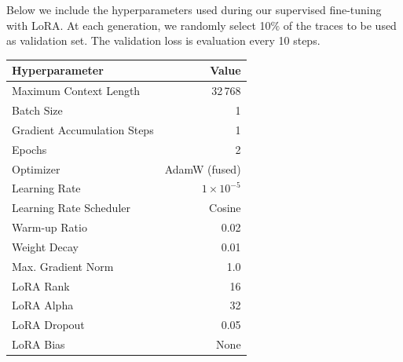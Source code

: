 Below we include the hyperparameters used during our supervised fine-tuning with
LoRA. At each generation, we randomly select 10$\%$ of the traces to be used as
validation set. The validation loss is evaluation every 10 steps.

\begin{center}
\begin{tabular}{lr}
\toprule
\textbf{Hyperparameter}      & \textbf{Value}     \\ \midrule
 Maximum Context Length      & 32\,768            \\
 Batch Size                  & 1                  \\
 Gradient Accumulation Steps & 1                  \\
 Epochs                      & 2                  \\
 Optimizer                   & AdamW (fused)      \\
 Learning Rate               & $1 \times 10^{-5}$ \\
 Learning Rate Scheduler     & Cosine             \\
 Warm-up Ratio                & 0.02               \\
 Weight Decay                & 0.01               \\
 Max. Gradient Norm          & 1.0                \\
 LoRA Rank                   & 16                 \\
 LoRA Alpha                  & 32                 \\
 LoRA Dropout                & 0.05               \\
 LoRA Bias                    & None               \\
\bottomrule
\end{tabular}
\end{center}
